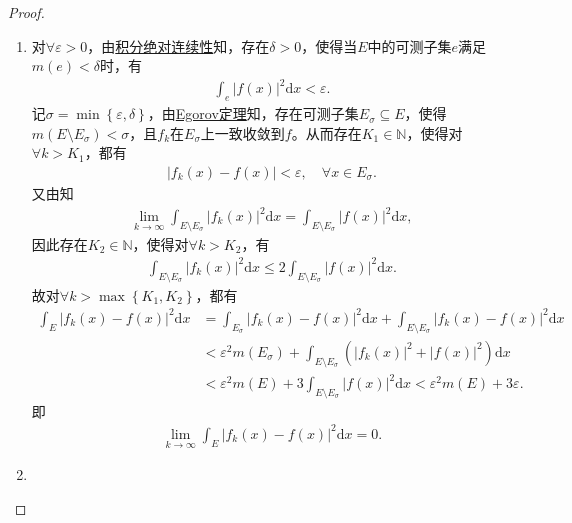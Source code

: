 \documentclass[../../main.tex]{subfiles}%
\begin{document}
\begin{proof}
\begin{enumerate}[(1)]
\item 对$\forall \varepsilon >0$，由\hyperref[theorem:积分的绝对连续性]{积分绝对连续性}知，存在$\delta >0$，使得当$E$中的可测子集$e$满足$m\left( e \right) <\delta $时，有
\begin{align*}
\int_e\left| f\left( x \right) \right|^2\mathrm{d}x<\varepsilon.
\end{align*}
记$\sigma =\min \left\{ \varepsilon ,\delta \right\}$，由\hyperref[theorem:Egorov定理]{Egorov定理}知，存在可测子集$E_{\sigma}\subseteq E$，使得$m\left( E\setminus E_{\sigma} \right) <\sigma $，且$f_k$在$E_{\sigma}$上一致收敛到$f$。从而存在$K_1\in \mathbb{N} $，使得对$\forall k>K_1$，都有
\begin{align*}
\left| f_k\left( x \right) -f\left( x \right) \right|<\varepsilon ,\quad \forall x\in E_{\sigma}.
\end{align*}
又由知
\begin{align*}
\lim\limits_{k\rightarrow \infty}\int_{E\setminus E_{\sigma}}\left| f_k\left( x \right) \right|^2\mathrm{d}x=\int_{E\setminus E_{\sigma}}\left| f\left( x \right) \right|^2\mathrm{d}x,
\end{align*}
因此存在$K_2\in \mathbb{N} $，使得对$\forall k>K_2$，有
\begin{align*}
\int_{E\setminus E_{\sigma}}\left| f_k\left( x \right) \right|^2\mathrm{d}x\leqslant 2\int_{E\setminus E_{\sigma}}\left| f\left( x \right) \right|^2\mathrm{d}x.
\end{align*}
故对$\forall k>\max \left\{ K_1,K_2 \right\}$，都有
\begin{align*}
\int_E\left| f_k\left( x \right) -f\left( x \right) \right|^2\mathrm{d}x&=\int_{E_{\sigma}}\left| f_k\left( x \right) -f\left( x \right) \right|^2\mathrm{d}x+\int_{E\setminus E_{\sigma}}\left| f_k\left( x \right) -f\left( x \right) \right|^2\mathrm{d}x\\
&<\varepsilon^2 m\left( E_{\sigma} \right) +\int_{E\setminus E_{\sigma}}\left( \left| f_k\left( x \right) \right|^2+\left| f\left( x \right) \right|^2 \right) \mathrm{d}x\\
&<\varepsilon^2 m\left( E \right) +3\int_{E\setminus E_{\sigma}}\left| f\left( x \right) \right|^2\mathrm{d}x<\varepsilon^2 m\left( E \right) +3\varepsilon.
\end{align*}
即
\begin{align*}
\lim\limits_{k\rightarrow \infty}\int_E\left| f_k\left( x \right) -f\left( x \right) \right|^2\mathrm{d}x=0.
\end{align*}

\item 
\end{enumerate}

\end{proof}
\end{document}
